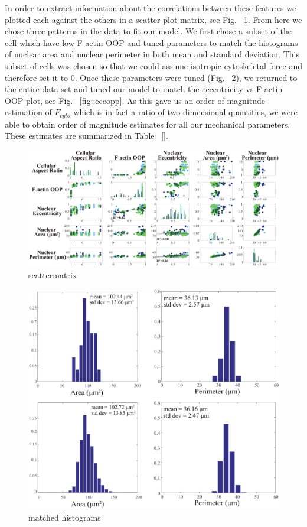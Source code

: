 In order to extract information about the correlations between these features we plotted each against the others in a scatter plot matrix, see Fig. ~\ref{fig::scattermatrix}. From here we chose three patterns in the data to fit our model. We first chose a subset of the cell which have low F-actin OOP and tuned parameters to match the histograms of nuclear area and nuclear perimeter in both mean and standard deviation. This subset of cells was chosen so that we could assume isotropic cytoskeletal force and therefore set it to 0. Once these parameters were tuned (Fig. ~\ref{fig::histos}), we returned to the entire data set and tuned our model to match the eccentricity vs F-actin OOP plot, see Fig. ~\ref{fig::eccopp}. As this gave us an order of magnitude estimation of $F_{cyto}$ which is in fact a ratio of two dimensional quantities, we were able to obtain order of magnitude estimates for all our mechanical parameters. These estimates are summarized in Table ~\ref{}.

\begin{figure}[h]
\centering
\captionsetup{width=.9\linewidth}
\includegraphics[width=6in]{Project3/figs/Nancy_data.pdf}
\caption{scattermatrix}
\label{fig::scattermatrix}
\end{figure}


\begin{figure}[h]
\centering
\captionsetup{width=.9\linewidth}
\includegraphics[width=4.5in]{Project3/figs/matching_histograms_areaandperim.eps}
\caption{matched histograms}
\label{fig::histos}
\end{figure}

